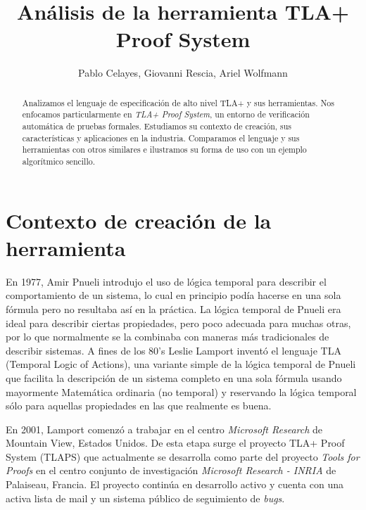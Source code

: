 \documentclass[spanish]{llncs}
\begin{document}
%

\mainmatter              %
%
\title{Análisis de la herramienta TLA+ Proof System}
%
%
\author{Pablo Celayes, Giovanni Rescia, Ariel Wolfmann}

%

\maketitle              %

\begin{abstract}
Analizamos el lenguaje de especificación de alto nivel TLA+ y sus herramientas.
Nos enfocamos particularmente en \textit{TLA+ Proof System}, un entorno de verificación automática de pruebas formales.
Estudiamos su contexto de creación, sus características y aplicaciones en la industria.
Comparamos el lenguaje y sus herramientas con otros similares e ilustramos su forma de uso con un ejemplo algorítmico sencillo.
\end{abstract}
%

\section{Contexto de creación de la herramienta}

 En 1977, Amir Pnueli introdujo el uso de lógica temporal para describir el comportamiento de un sistema, lo cual en principio podía hacerse en una sola fórmula pero no resultaba así en la práctica. La lógica temporal de Pnueli era ideal para describir ciertas propiedades, pero poco adecuada para muchas otras, por lo que normalmente se la combinaba con maneras más tradicionales de describir sistemas. \cite{pnueli} A fines de los 80's Leslie Lamport inventó el lenguaje TLA (Temporal Logic of Actions), una variante simple de la lógica temporal de Pnueli que facilita la descripción de un sistema completo en una sola fórmula usando mayormente Matemática ordinaria (no temporal) y reservando la lógica temporal sólo para aquellas propiedades en las que realmente es buena. \cite{specsys}
 
 En 2001, Lamport comenzó a trabajar en el centro \textit{Microsoft Research} de Mountain View, Estados Unidos. De esta etapa surge el proyecto TLA+ Proof System (TLAPS) que actualmente se desarrolla como parte del proyecto \textit{Tools for Proofs} en el centro conjunto de investigación \textit{Microsoft Research - INRIA} de Palaiseau, Francia. 
 El proyecto continúa en desarrollo activo y cuenta con una activa lista de mail y un sistema público de seguimiento de \textit{bugs}.
\end{document}

